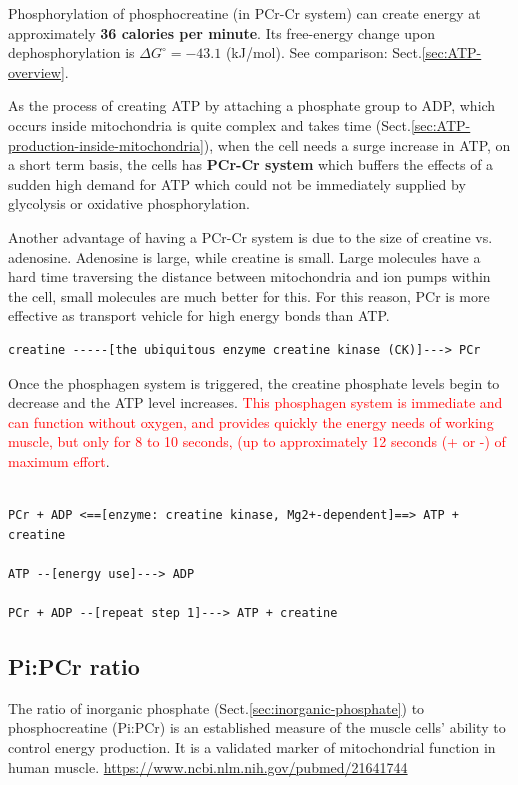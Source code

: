 Phosphorylation of phosphocreatine (in PCr-Cr system) can create energy at
approximately {\bf 36 calories per minute}. Its free-energy change upon
dephosphorylation is $\Delta G^\circ = -43.1 $ (kJ/mol). See comparison:
Sect.\ref{sec:ATP-overview}.

As the process of creating ATP by attaching a phosphate group to ADP, which
occurs inside mitochondria is quite complex and takes time
(Sect.\ref{sec:ATP-production-inside-mitochondria}), when the cell needs a surge
increase in ATP, on a short term basis, the cells has {\bf PCr-Cr system} which
buffers the effects of a sudden high demand for ATP which could not be
immediately supplied by glycolysis or oxidative phosphorylation.

Another advantage of having a PCr-Cr system is due to the size of creatine vs.
adenosine. Adenosine is large, while creatine is small. Large molecules have a
hard time traversing the distance between mitochondria and ion pumps within the cell,
small molecules are much better for this. For this reason, PCr is more effective
as transport vehicle for high energy bonds than ATP.


{\small
\begin{verbatim}
creatine -----[the ubiquitous enzyme creatine kinase (CK)]---> PCr
\end{verbatim}
}


Once the phosphagen system is triggered, the creatine phosphate levels begin to
decrease and the ATP level increases. \textcolor{red}{This phosphagen system is
immediate and can function without oxygen, and provides quickly the energy needs
of working muscle, but only for 8 to 10 seconds, (up to approximately 12 seconds
(+ or -) of maximum effort}.

{\tiny
\begin{verbatim}

PCr + ADP <==[enzyme: creatine kinase, Mg2+-dependent]==> ATP + creatine

ATP --[energy use]---> ADP

PCr + ADP --[repeat step 1]---> ATP + creatine
\end{verbatim}
}

\subsection{Pi:PCr ratio}
\label{sec:Pi-PCr-ratio}
\label{sec:P_i-PCr-ratio}

The ratio of inorganic phosphate (Sect.\ref{sec:inorganic-phosphate}) to
phosphocreatine (Pi:PCr) is an established measure of the muscle cells' ability
to control energy production.
It is a validated marker of mitochondrial function in human muscle.
\url{https://www.ncbi.nlm.nih.gov/pubmed/21641744}


